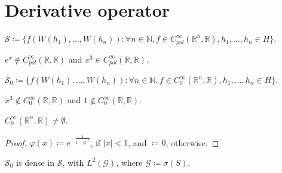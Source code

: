 \chapter{Derivative operator}

\begin{notation}
$\mathcal{S} \coloneqq 
\{f(W(h_1), \dots, W(h_n)) : \forall n \in \mathbb{N}, f \in C_{pol}^{\infty}(\mathbb{R}^n, \mathbb{R}), h_1, \dots, h_n \in H
\}$. 
\end{notation}

\begin{example}
$e^x \notin C_{pol}^{\infty}(\mathbb{R}, \mathbb{R})$
and $x^3 \in C_{pol}^{\infty}(\mathbb{R}, \mathbb{R})$. 
\end{example}

\begin{notation}
$\mathcal{S}_{0} \coloneqq 
\{f(W(h_1), \dots, W(h_n)) : \forall n \in \mathbb{N}, f \in C_{0}^{\infty}(\mathbb{R}^n, \mathbb{R}), h_1, \dots, h_n \in H
\}$.
\end{notation}

\begin{example}
$x^3 \notin C_{0}^{\infty}(\mathbb{R}, \mathbb{R})$
and $1 \notin C_{0}^{\infty}(\mathbb{R}, \mathbb{R})$. 
\end{example}

\begin{proposition}
\label{proposition:smoothing varphi}
$C_{0}^{\infty}(\mathbb{R}^n, \mathbb{R}) \neq \emptyset$. 
\end{proposition}

\begin{proof}
$\varphi(x) \coloneqq e^{- \frac{1}{1- \lvert x \rvert^2}} $, 
if $\lvert x \rvert < 1$, 
and $\coloneqq 0$, otherwise. 
\end{proof}

\begin{lemma}
$\mathcal{S}_{0}$ is dense in $\mathcal{S}$, with $L^2(\mathcal{G})$, where $\mathcal{G} \coloneqq \sigma(S)$. 
\end{lemma}

